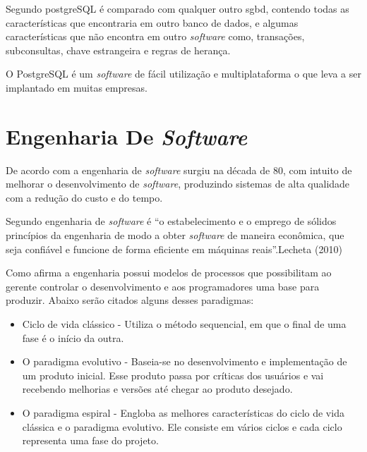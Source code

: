 	\par Segundo  postgreSQL é comparado com
qualquer outro sgbd, contendo todas as características que encontraria em outro
banco de dados, e algumas características que não encontra em outro
\textit{software} como, transações, subconsultas, chave estrangeira e regras de
herança.

	\par O PostgreSQL é um \textit{software} de fácil utilização e multiplataforma
o que leva a ser implantado em muitas empresas.


\section{Engenharia De \textit{Software}}

	\par De acordo com  a engenharia de \textit{software}
surgiu na década de 80, com intuito de melhorar o desenvolvimento de
\textit{software}, produzindo sistemas de alta qualidade com a redução do custo
e do tempo.

	\par Segundo  engenharia de \textit{software} é
“o estabelecimento e o emprego de sólidos princípios da engenharia de modo a
obter \textit{software} de maneira econômica, que seja confiável e funcione de
forma eficiente em máquinas reais”.Lecheta (2010)

	\par Como afirma  a engenharia possui modelos de
processos que possibilitam ao gerente controlar o desenvolvimento e aos
programadores uma base para produzir. Abaixo serão citados alguns desses
paradigmas:

	\begin{itemize}
	  
	  \item Ciclo de vida clássico - Utiliza o método sequencial, em que o final
	  de uma fase é o início da outra.
	  
	  \item O paradigma evolutivo - Baseia-se no desenvolvimento e implementação
	  de um produto inicial. Esse produto passa por críticas dos usuários e vai
	  recebendo melhorias e versões até chegar ao produto desejado.
	  
	  \item O paradigma espiral - Engloba as melhores características do ciclo de
	  vida clássica e o paradigma evolutivo. Ele consiste em vários ciclos e cada
	  ciclo representa uma fase do projeto.
	
	\end{itemize}



